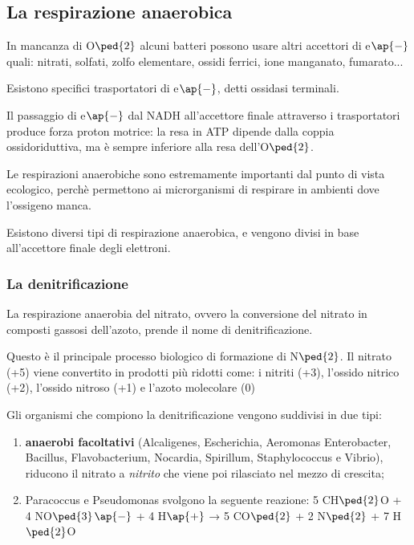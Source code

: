 \documentclass[11pt]{book}
\begin{document}
\subsection{La respirazione anaerobica}
In mancanza di O$\ped{2}$ alcuni batteri possono usare altri accettori di e$\ap{-}$ quali: nitrati, solfati, zolfo elementare, ossidi ferrici, ione manganato, fumarato... 

Esistono specifici trasportatori di e$\ap{-}$, detti ossidasi terminali. 

Il passaggio di e$\ap{-}$ dal NADH all’accettore finale attraverso i trasportatori produce forza proton motrice: la resa in ATP dipende dalla coppia ossidoriduttiva, ma è sempre inferiore alla resa dell'O$\ped{2}$.

Le respirazioni anaerobiche sono estremamente importanti dal punto di vista ecologico, perchè permettono ai microrganismi di respirare in ambienti dove l’ossigeno manca.

Esistono diversi tipi di respirazione anaerobica, e vengono divisi in base all'accettore finale degli elettroni.

\subsubsection{La denitrificazione}
La respirazione anaerobia del nitrato, ovvero la conversione del nitrato in composti gassosi dell’azoto, prende il nome di denitrificazione.

Questo è il principale processo biologico di formazione di N$\ped{2}$. 
Il nitrato (+5) viene convertito in prodotti più ridotti come: i nitriti (+3), l’ossido nitrico (+2), l'ossido nitroso (+1) e l'azoto molecolare (0) 

Gli organismi che compiono la denitrificazione vengono suddivisi in due tipi:
\begin{enumerate}
\item \textbf{anaerobi facoltativi} (Alcaligenes, Escherichia, Aeromonas Enterobacter, Bacillus, Flavobacterium, Nocardia, Spirillum, Staphylococcus e Vibrio), riducono il nitrato a \emph{nitrito} che viene poi rilasciato nel mezzo di crescita;
\item Paracoccus e Pseudomonas svolgono la seguente reazione: 
5 CH$\ped{2}$O + 4 NO$\ped{3}$$\ap{-}$ + 4 H$\ap{+}$ → 5 CO$\ped{2}$ + 2 N$\ped{2}$ + 7 H$\ped{2}$O 
\end{enumerate}
\end{document}
